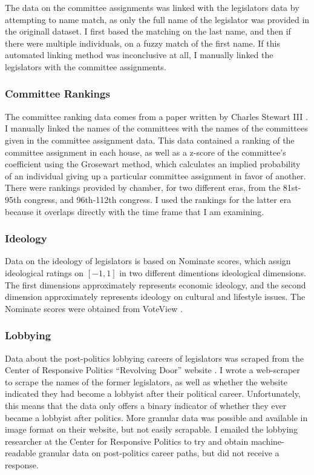 \documentclass{article}
\begin{document}
The data on the committee assignments was linked with the legislators data by attempting to name match, as only the full name of the legislator was provided in the originall dataset. I first based the matching on the last name, and then if there were multiple individuals, on a fuzzy match of the first name. If this automated linking method was inconclusive at all, I manually linked the legislators with the committee assignments. 

\subsubsection{Committee Rankings}
The committee ranking data comes from a paper written by Charles Stewart III \cite{stewart-committee-values}. I manually linked the names of the committees with the names of the committees given in the committee assignment data. This data contained a ranking of the committee assignment in each house, as well as a z-score of the committee's coefficient using the Grosewart method, which calculates an implied probability of an individual giving up a particular committee assignment in favor of another. There were rankings provided by chamber, for two different eras, from the 81st-95th congress, and 96th-112th congress. I used the rankings for the latter era because it overlaps directly with the time frame that I am examining.

\subsubsection{Ideology}
Data on the ideology of legislators is based on Nominate scores, which assign ideological ratings on $[-1 , 1]$ in two different dimentions ideological dimensions. The first dimensions approximately represents economic ideology, and the second dimension approximately represents ideology on cultural and lifestyle issues. The Nominate scores were obtained from VoteView \cite{nominate}.

\subsubsection{Lobbying}
Data about the post-politics lobbying careers of legislators was scraped from the Center of Responsive Politics ``Revolving Door'' website \cite{revolving-door}. I wrote a web-scraper to scrape the names of the former legislators, as well as whether the website indicated they had become a lobbyist after their political career. Unfortunately, this means that the data only offers a binary indicator of whether they ever became a lobbyist after politics. More granular data was possible and available in image format on their website, but not easily scrapable. I emailed the lobbying researcher at the Center for Responsive Politics to try and obtain machine-readable granular data on post-politics career paths, but did not receive a response. 
\end{document}
